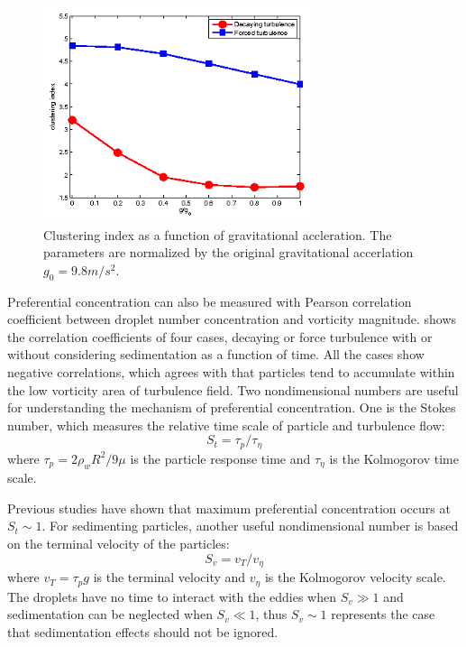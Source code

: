 \begin{figure}[H]\centering
\includegraphics[width=0.7\textwidth]{Figures/sedwithgravity}
\caption{Clustering index as a function of gravitational accleration. The parameters are normalized by the original gravitational accerlation $g_0 = 9.8m/s^2$.}\label{fig:sed_gravity}
\end{figure}

Preferential concentration can also be measured with Pearson correlation
coefficient between droplet number concentration and vorticity magnitude.
 shows the correlation coefficients of four cases,
decaying or force turbulence with or without considering sedimentation as a
function of time. All the cases show negative correlations, which agrees with
that particles tend to accumulate within the low vorticity area of turbulence
field. Two nondimensional numbers are useful for understanding the mechanism of
preferential concentration. One is the Stokes number, which measures the
relative time scale of particle and turbulence flow:
\begin{equation}
S_t = \tau_p/\tau_{\eta}
\end{equation}
where $\tau_p = 2\rho_wR^2/9\mu$ is the particle response time and
$\tau_{\eta}$ is the Kolmogorov time scale.

Previous studies \cite{grabowski1999comments,vaillancourt2000review} have shown
that maximum preferential concentration occurs at $S_t \sim 1$. For sedimenting
particles, another useful nondimensional number is based on the terminal
velocity of the particles:
\begin{equation}
S_v = v_T/v_{\eta}
\end{equation}
where $v_T = \tau_p g$ is the terminal velocity and $v_{\eta}$ is the
Kolmogorov velocity scale. The droplets have no time to interact with the
eddies when $S_v \gg 1$ and sedimentation can be neglected when $S_v \ll 1$,
thus $S_v \sim 1$ represents the case that sedimentation effects should not be
ignored.

